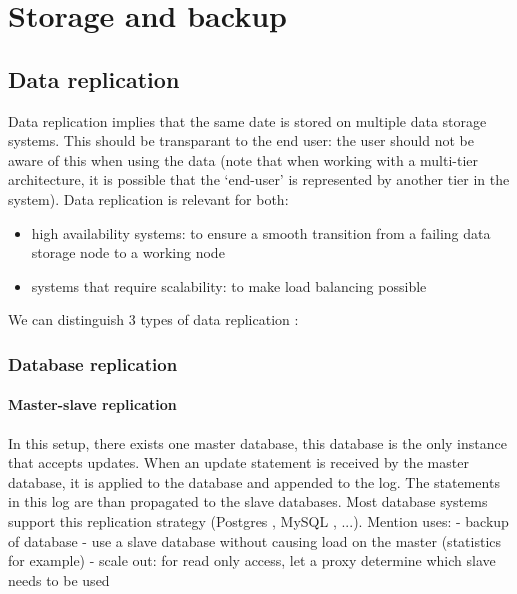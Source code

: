 \documentclass[12pt]{report}
\begin{document}
\section{Storage and backup}

\subsection{Data replication}
Data replication implies that the same date is stored on multiple
data storage systems. This should be transparant to the end user: the
user should not be aware of this when using the data (note that when
working with a multi-tier architecture, it is possible that the
`end-user'  is represented by another tier in the system).
Data replication is relevant for both:
\begin{itemize}
\item high availability systems: to ensure a smooth transition from a
  failing data storage node to a working node
\item systems that require scalability: to make load balancing possible
\end{itemize}
We can distinguish 3 types of data replication
\cite{datareplication:2013} :

\subsubsection{Database replication}

\paragraph*{Master-slave replication}
In this setup, there exists one master database, this database is the only instance
that accepts updates. When an update statement is received by the
master database, it is applied to the database and appended to the log. The statements
in this log are than propagated to the slave databases.
Most database systems support this replication strategy (Postgres \cite{postgres_db:2013},
MySQL \cite{mysql_db:2013}, ...).
Mention uses:
- backup of database
- use a slave database without causing load on the master (statistics
for example)
- scale out: for read only access, let a proxy determine which slave
needs to be used
\end{document}
